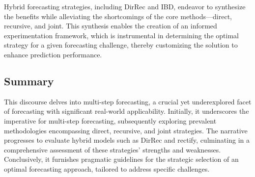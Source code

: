 \documentclass{article}
\begin{document}
Hybrid forecasting strategies, including DirRec and IBD, endeavor to synthesize the benefits while alleviating the shortcomings of the core methods—direct, recursive, and joint. This synthesis enables the creation of an informed experimentation framework, which is instrumental in determining the optimal strategy for a given forecasting challenge, thereby customizing the solution to enhance prediction performance.


\subsection{Summary}
This discourse delves into multi-step forecasting, a crucial yet underexplored facet of forecasting with significant real-world applicability. Initially, it underscores the imperative for multi-step forecasting, subsequently exploring prevalent methodologies encompassing direct, recursive, and joint strategies. The narrative progresses to evaluate hybrid models such as DirRec and rectify, culminating in a comprehensive assessment of these strategies' strengths and weaknesses. Conclusively, it furnishes pragmatic guidelines for the strategic selection of an optimal forecasting approach, tailored to address specific challenges.
\end{document}
